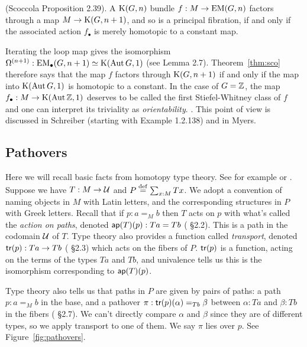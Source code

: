 \begin{mythm}
\label{thm:sco}
(Scoccola\cite{sco} Proposition 2.39). A \( \mathrm{K}(G,n) \) bundle \( f:M\to\mathrm{EM}(G,n) \) factors through a map \( M\to\mathrm{K}(G,n+1) \), and so is a principal fibration, if and only if the associated action \( f_\bullet \) is merely homotopic to a constant map.
\end{mythm}

\begin{mynote}
Iterating the loop map gives the isomorphism \( \Omega^{(n+1)}:\mathrm{EM_{\bullet}}(G,n+1)\simeq \mathrm{K}(\operatorname{Aut} G,1) \) (see \cite{sco} Lemma 2.7). Theorem~\ref{thm:sco} therefore says that the map \( f \) factors through \( \mathrm{K}(G,n+1) \) if and only if the map into \( \mathrm{K}(\operatorname{Aut} G,1) \) is homotopic to a constant. In the case of \( G=\mathbb{Z} \), the map \( f_\bullet:M\to \mathrm{K}(\operatorname{Aut} \mathbb{Z}, 1) \) deserves to be called the first Stiefel-Whitney class of \( f \) and one can interpret its triviality as \emph{orientability}. . This point of view is discussed in Schreiber\cite{dcct} (starting with Example 1.2.138) and in Myers\cite{myersgood}.
\end{mynote}

\subsection{Pathovers}
\label{sec:pathovers}
Here we will recall basic facts from homotopy type theory. See for example \cite{hottbook} or \cite{egbert}. Suppose we have \( T:M\to\mathcal{U} \) and \( P\stackrel{\mathrm{def}}{=}\sum_{x:M}Tx \). We adopt a convention of naming objects in \( M \) with Latin letters, and the corresponding structures in \( P \) with Greek letters. Recall that if \( p:a=_M b \) then \( T \) acts on \( p \) with what's called the \emph{action on paths}, denoted \( \mathsf{ap}(T)(p):Ta=Tb \) (\cite{hottbook} §2.2). This is a path in the codomain \( \mathcal{U} \) of \( T \). Type theory also provides a function called \emph{transport}, denoted \( \mathsf{tr}(p):Ta\to Tb \) (\cite{hottbook} §2.3) which acts on the fibers of \( P \). \( \mathsf{tr}(p) \) is a function, acting on the terms of the types \( Ta \) and \( Tb \), and univalence tells us this is the isomorphism corresponding to \( \mathsf{ap}(T)(p) \).

Type theory also tells us that paths in \( P \) are given by pairs of paths: a path \( p:a=_M b \) in the base, and a pathover \( \pi:\mathsf{tr}(p)(\alpha)=_{Tb}\beta \) between \( \alpha:Ta \) and \( \beta:Tb \) in the fibers (\cite{hottbook} §2.7). We can't directly compare \( \alpha \) and \( \beta \) since they are of different types, so we apply transport to one of them. We say \( \pi \) lies over \( p \). See Figure~\ref{fig:pathovers}.

